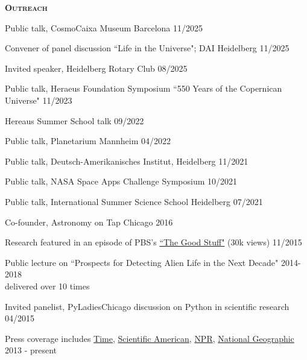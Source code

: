 \documentclass[12pt,letterpaper]{article}
\begin{document}


\vspace{7mm}

\textbf{\textsc{Outreach}} 
\begin{compactitem}[]
\item Public talk, CosmoCaixa Museum Barcelona \hfill 11/2025 
\item Convener of panel discussion ``Life in the Universe"; DAI Heidelberg \hfill 11/2025
\item Invited speaker, Heidelberg Rotary Club \hfill 08/2025
\item Public talk, Heraeus Foundation Symposium  ``550 Years of the Copernican Universe"  \hfill 11/2023
\item Hereaus Summer School talk \hfill 09/2022
\item Public talk, Planetarium Mannheim \hfill 04/2022
\item Public talk, Deutsch-Amerikanisches Institut, Heidelberg \hfill 11/2021
\item Public talk, NASA Space Apps Challenge Symposium \hfill 10/2021
\item Public talk, International Summer Science School Heidelberg \hfill 07/2021
\item Co-founder, Astronomy on Tap Chicago \hfill 2016
\item Research featured in an episode of PBS's \href{https://www.youtube.com/watch?v=i4Hrmh6LJ0Q&index=2&list=PLsRLUurFnvvXTEbTjA1tvHhWmh6aKTgDw}{``The Good Stuff"} (30k views) \hfill 11/2015
\item Public lecture on ``Prospects for Detecting Alien Life in the Next Decade" \hfill 2014-2018 \\
\hspace*{5 mm}delivered over 10 times
\item Invited panelist, PyLadiesChicago discussion on Python in scientific research \hfill 04/2015
\item Press coverage includes \href{http://science.time.com/2013/12/31/the-real-space-oddities-super-earths-and-jumbo-neptunes/}{Time}, \href{http://www.nature.com/scientificamerican/journal/v23/n3s/full/scientificamericanuniverse0814-4.html}{Scientific American}, \href{http://www.npr.org/2014/01/02/259222620/on-planet-gj1214-b-expect-exotic-cloud-cover}{NPR}, \href{http://news.nationalgeographic.com/news/2014/10/141014-space-hubble-planet-weather-science/?utm_source=Twitter&utm_medium=Social&utm_content=link_tw20141014news-hubbletele&utm_campaign=Content&sf5218387=1}{National Geographic} \hfill 2013 - present

\end{compactitem}
\end{document}
